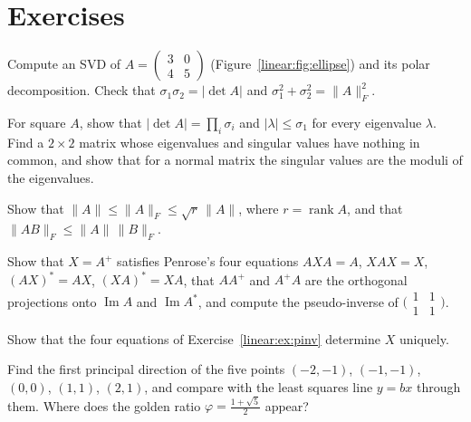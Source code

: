 \section{Exercises}

\begin{exercise}[$\star$]\label{linear:ex:svd2}
Compute an SVD of $A=\begin{pmatrix}3&0\\4&5\end{pmatrix}$ (Figure~\ref{linear:fig:ellipse}) and its polar decomposition. Check that
$\sigma_1\sigma_2=|\det A|$ and $\sigma_1^2+\sigma_2^2=\|A\|_F^2$.
\end{exercise}

\begin{exercise}[$\star$]\label{linear:ex:normsvd}
For square $A$, show that $|\det A|=\prod_i\sigma_i$ and $|\lambda|\le\sigma_1$ for every eigenvalue $\lambda$. Find a $2\times2$
matrix whose eigenvalues and singular values have nothing in common, and show that for a normal matrix the singular values
are the moduli of the eigenvalues.
\end{exercise}

\begin{exercise}[$\star$]\label{linear:ex:normineq}
Show that $\|A\|\le\|A\|_F\le\sqrt r\,\|A\|$, where $r=\operatorname{rank}A$, and that $\|AB\|_F\le\|A\|\,\|B\|_F$.
\end{exercise}

\begin{exercise}[$\star$]\label{linear:ex:pinv}
Show that $X=A^+$ satisfies Penrose's four equations $AXA=A$, $XAX=X$, $(AX)^*=AX$, $(XA)^*=XA$, that $AA^+$ and $A^+A$ are
the orthogonal projections onto $\operatorname{Im}A$ and $\operatorname{Im}A^*$, and compute the pseudo-inverse of
$\bigl(\begin{smallmatrix}1&1\\1&1\end{smallmatrix}\bigr)$.
\end{exercise}

\begin{exercise}[$\star\star$]\label{linear:ex:penroseunique}
Show that the four equations of Exercise~\ref{linear:ex:pinv} determine $X$ uniquely.
\end{exercise}

\begin{exercise}[$\star\star$]\label{linear:ex:pcatoy}
Find the first principal direction of the five points $(-2,-1)$, $(-1,-1)$, $(0,0)$, $(1,1)$, $(2,1)$, and compare with
the least squares line $y=bx$ through them. Where does the golden ratio $\varphi=\frac{1+\sqrt5}2$ appear?
\end{exercise}

